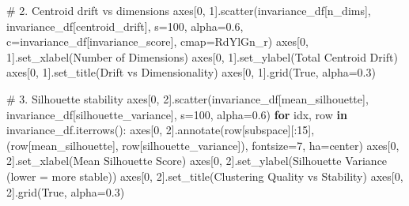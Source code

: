 \documentclass[
  letterpaper,
  DIV=11,
  numbers=noendperiod]{scrartcl}
\newenvironment{Shaded}{\begin{snugshade}}{\end{snugshade}}
\newcommand{\CommentTok}[1]{\textcolor[rgb]{0.37,0.37,0.37}{#1}}
\newcommand{\ControlFlowTok}[1]{\textcolor[rgb]{0.00,0.23,0.31}{\textbf{#1}}}
\newcommand{\DecValTok}[1]{\textcolor[rgb]{0.68,0.00,0.00}{#1}}
\newcommand{\FloatTok}[1]{\textcolor[rgb]{0.68,0.00,0.00}{#1}}
\newcommand{\KeywordTok}[1]{\textcolor[rgb]{0.00,0.23,0.31}{\textbf{#1}}}
\newcommand{\NormalTok}[1]{\textcolor[rgb]{0.00,0.23,0.31}{#1}}
\newcommand{\OperatorTok}[1]{\textcolor[rgb]{0.37,0.37,0.37}{#1}}
\newcommand{\StringTok}[1]{\textcolor[rgb]{0.13,0.47,0.30}{#1}}
\newcommand{\VariableTok}[1]{\textcolor[rgb]{0.07,0.07,0.07}{#1}}
\renewenvironment{Shaded}{%
  \begin{tcolorbox}[%
    enhanced,%
    colback=codebg,%
    colframe=codebg,%
    borderline west={3pt}{0pt}{sectionblue},%
    fontupper=\small\ttfamily,%
    boxrule=0pt,%
    arc=0pt,%
    boxsep=5pt,%
    left=2mm,%
    right=2mm,%
    top=2mm,%
    bottom=2mm%
  ]%
}{%
  \end{tcolorbox}%
}
\begin{document}
\begin{Shaded}
\begin{Highlighting}[]
\CommentTok{\# 2. Centroid drift vs dimensions}
\NormalTok{axes[}\DecValTok{0}\NormalTok{, }\DecValTok{1}\NormalTok{].scatter(invariance\_df[}\StringTok{\textquotesingle{}n\_dims\textquotesingle{}}\NormalTok{], invariance\_df[}\StringTok{\textquotesingle{}centroid\_drift\textquotesingle{}}\NormalTok{], }
\NormalTok{                  s}\OperatorTok{=}\DecValTok{100}\NormalTok{, alpha}\OperatorTok{=}\FloatTok{0.6}\NormalTok{, c}\OperatorTok{=}\NormalTok{invariance\_df[}\StringTok{\textquotesingle{}invariance\_score\textquotesingle{}}\NormalTok{], }
\NormalTok{                  cmap}\OperatorTok{=}\StringTok{\textquotesingle{}RdYlGn\_r\textquotesingle{}}\NormalTok{)}
\NormalTok{axes[}\DecValTok{0}\NormalTok{, }\DecValTok{1}\NormalTok{].set\_xlabel(}\StringTok{\textquotesingle{}Number of Dimensions\textquotesingle{}}\NormalTok{)}
\NormalTok{axes[}\DecValTok{0}\NormalTok{, }\DecValTok{1}\NormalTok{].set\_ylabel(}\StringTok{\textquotesingle{}Total Centroid Drift\textquotesingle{}}\NormalTok{)}
\NormalTok{axes[}\DecValTok{0}\NormalTok{, }\DecValTok{1}\NormalTok{].set\_title(}\StringTok{\textquotesingle{}Drift vs Dimensionality\textquotesingle{}}\NormalTok{)}
\NormalTok{axes[}\DecValTok{0}\NormalTok{, }\DecValTok{1}\NormalTok{].grid(}\VariableTok{True}\NormalTok{, alpha}\OperatorTok{=}\FloatTok{0.3}\NormalTok{)}

\CommentTok{\# 3. Silhouette stability}
\NormalTok{axes[}\DecValTok{0}\NormalTok{, }\DecValTok{2}\NormalTok{].scatter(invariance\_df[}\StringTok{\textquotesingle{}mean\_silhouette\textquotesingle{}}\NormalTok{], invariance\_df[}\StringTok{\textquotesingle{}silhouette\_variance\textquotesingle{}}\NormalTok{],}
\NormalTok{                  s}\OperatorTok{=}\DecValTok{100}\NormalTok{, alpha}\OperatorTok{=}\FloatTok{0.6}\NormalTok{)}
\ControlFlowTok{for}\NormalTok{ idx, row }\KeywordTok{in}\NormalTok{ invariance\_df.iterrows():}
\NormalTok{    axes[}\DecValTok{0}\NormalTok{, }\DecValTok{2}\NormalTok{].annotate(row[}\StringTok{\textquotesingle{}subspace\textquotesingle{}}\NormalTok{][:}\DecValTok{15}\NormalTok{], }
\NormalTok{                       (row[}\StringTok{\textquotesingle{}mean\_silhouette\textquotesingle{}}\NormalTok{], row[}\StringTok{\textquotesingle{}silhouette\_variance\textquotesingle{}}\NormalTok{]),}
\NormalTok{                       fontsize}\OperatorTok{=}\DecValTok{7}\NormalTok{, ha}\OperatorTok{=}\StringTok{\textquotesingle{}center\textquotesingle{}}\NormalTok{)}
\NormalTok{axes[}\DecValTok{0}\NormalTok{, }\DecValTok{2}\NormalTok{].set\_xlabel(}\StringTok{\textquotesingle{}Mean Silhouette Score\textquotesingle{}}\NormalTok{)}
\NormalTok{axes[}\DecValTok{0}\NormalTok{, }\DecValTok{2}\NormalTok{].set\_ylabel(}\StringTok{\textquotesingle{}Silhouette Variance (lower = more stable)\textquotesingle{}}\NormalTok{)}
\NormalTok{axes[}\DecValTok{0}\NormalTok{, }\DecValTok{2}\NormalTok{].set\_title(}\StringTok{\textquotesingle{}Clustering Quality vs Stability\textquotesingle{}}\NormalTok{)}
\NormalTok{axes[}\DecValTok{0}\NormalTok{, }\DecValTok{2}\NormalTok{].grid(}\VariableTok{True}\NormalTok{, alpha}\OperatorTok{=}\FloatTok{0.3}\NormalTok{)}


\end{Highlighting}
\end{Shaded}
\end{document}
